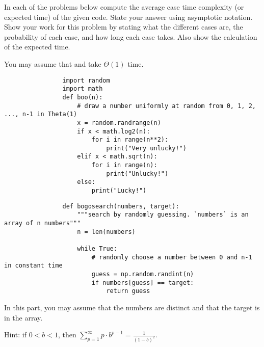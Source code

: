 \begin{prob}
    In each of the problems below compute the average case time complexity (or
    expected time) of the given code. State your answer using asymptotic
    notation. Show your work for this problem by stating what the different
    cases are, the probability of each case, and how long each case takes. Also
    show the calculation of the expected time.

    You may assume that  and  take $\Theta(1)$ time.

    \begin{subprobset}
        \begin{subprob}
            \begin{verbatim}
                import random
                import math
                def boo(n):
                    # draw a number uniformly at random from 0, 1, 2, ..., n-1 in Theta(1) 
                    x = random.randrange(n)
                    if x < math.log2(n):
                        for i in range(n**2):
                            print("Very unlucky!") 
                    elif x < math.sqrt(n):
                        for i in range(n):
                            print("Unlucky!") 
                    else:
                        print("Lucky!")
            \end{verbatim}
        \end{subprob}
    
    
        \begin{soln}
            
        \end{soln}

        \begin{subprob}
            \begin{verbatim}
                def bogosearch(numbers, target):
                    """search by randomly guessing. `numbers` is an array of n numbers"""
                    n = len(numbers)

                    while True:
                        # randomly choose a number between 0 and n-1 in constant time
                        guess = np.random.randint(n)
                        if numbers[guess] == target:
                            return guess
            \end{verbatim}

            In this part, you may assume that the numbers are distinct and that the
            target is in the array.

            Hint: if $0 < b < 1$, then $\sum_{p = 1}^\infty p \cdot b^{p-1} = \frac{1}{(1 - b)^2}$.

            \begin{soln}
            
            \end{soln}


        \end{subprob}
    \end{subprobset}
\end{prob}

